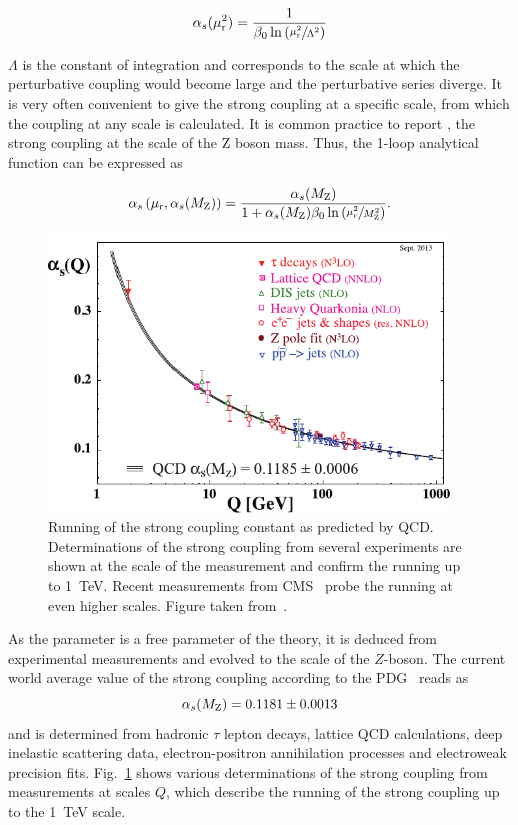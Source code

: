 \begin{equation*}
   \alpha_{s}(\mu_{\mathrm{r}}^2) = \frac{1}{\beta_0 \ln \left( \sfrac{\mu_{\mathrm{r}}^2}{\Lambda^2} \right)}
\end{equation*}

$\Lambda$ is the constant of integration and corresponds to the scale at which
the perturbative coupling would become large and the perturbative series
diverge. It is very often convenient to give the strong coupling at a specific
scale, from which the coupling at any scale is calculated. It is common practice
to report \asmz, the strong coupling at the scale of the Z boson mass. Thus, the
1-loop analytical function can be expressed as

\begin{equation*}
   \alpha_{s}\left(\mu_{\mathrm{r}}, \alpha_{s}(M_\mathrm{Z})\right) = \frac{\alpha_{s}(M_\mathrm{Z})}{1 + \alpha_{s}(M_\mathrm{Z})\beta_0 \ln
       \left( \sfrac{\mu_{\mathrm{r}}^2}{M_\mathrm{Z}^2} \right)}.
\end{equation*}

\begin{figure}[htbp] 
    \centering
    \includegraphics[width=0.95\textwidth]{figures/theoretical_foundations/as_running.pdf}\hfill
    \caption[Running of the strong coupling]{Running of the strong coupling
        constant as predicted by QCD. Determinations of the strong coupling from
        several experiments are shown at the scale of the measurement and
        confirm the running up to \SI{1}{\TeV}. Recent measurements from
        CMS~\cite{Khachatryan:2014waa,CMS:2014mna} probe the running at even
        higher scales. Figure taken from~\cite{Agashe:2014kda}.} 
    \label{fig:as_running} 
\end{figure}


As the parameter \as is a free parameter of the theory, it is deduced from
experimental measurements and evolved to the scale of the $Z$-boson. The current
world average value of the strong coupling according to the
PDG~\cite{Agashe:2014kda} reads as
%
\begin{equation*}
    \alpha_{s}(M_\mathrm{Z}) = 0.1181 \pm 0.0013
\end{equation*}
%
and is determined from hadronic $\tau$ lepton decays, lattice QCD calculations,
deep inelastic scattering data, electron-positron annihilation processes and
electroweak precision fits. Fig.~\ref{fig:as_running} shows various
determinations of the strong coupling from measurements at scales $Q$,
which describe the running of the strong coupling up to the \SI{1}{\TeV} scale.

